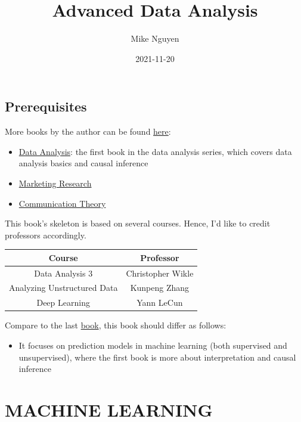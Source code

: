 \documentclass[
]{book}
\title{Advanced Data Analysis}
\author{Mike Nguyen}
\date{2021-11-20}
\providecommand{\tightlist}{%
  \setlength{\itemsep}{0pt}\setlength{\parskip}{0pt}}
\begin{document}
\maketitle

{
\setcounter{tocdepth}{1}
\tableofcontents
}
\hypertarget{prerequisites}{%
\chapter{Prerequisites}\label{prerequisites}}

More books by the author can be found \href{https://mikenguyen.netlify.app/books/written_books/}{here}:

\begin{itemize}
\tightlist
\item
  \href{https://bookdown.org/mike/data_analysis/}{Data Analysis}: the first book in the data analysis series, which covers data analysis basics and causal inference
\item
  \href{https://bookdown.org/mike/marketing_research/}{Marketing Research}
\item
  \href{https://bookdown.org/mike/comm_theory/}{Communication Theory}
\end{itemize}

This book's skeleton is based on several courses. Hence, I'd like to credit professors accordingly.

\begin{longtable}[]{@{}cc@{}}
\toprule
Course & Professor\tabularnewline
\midrule
\endhead
Data Analysis 3 & Christopher Wikle\tabularnewline
Analyzing Unstructured Data & Kunpeng Zhang\tabularnewline
Deep Learning & Yann LeCun\tabularnewline
\bottomrule
\end{longtable}

Compare to the last \href{https://bookdown.org/mike/data_analysis/}{book}, this book should differ as follows:

\begin{itemize}
\tightlist
\item
  It focuses on prediction models in machine learning (both supervised and unsupervised), where the first book is more about interpretation and causal inference
\end{itemize}

\hypertarget{part-machine-learning}{%
\part{MACHINE LEARNING}\label{part-machine-learning}}
\end{document}
